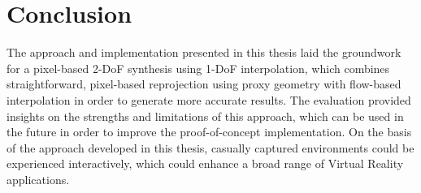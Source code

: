 \chapter{Conclusion}

The approach and implementation presented in this thesis laid the groundwork for a pixel-based 2-DoF synthesis using 1-DoF interpolation, which combines
straightforward, pixel-based reprojection using proxy geometry with flow-based interpolation in order to generate more accurate results.
The evaluation provided insights on the strengths and limitations of this approach, which can be used in the future in order to improve the proof-of-concept implementation.
On the basis of the approach developed in this thesis,
casually captured environments could be experienced interactively, which could enhance a broad range of Virtual Reality applications.



